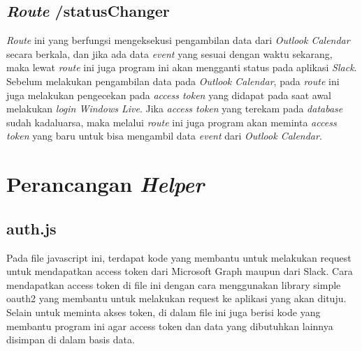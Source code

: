 \subsection{\textit{Route} /statusChanger}
\textit{Route} ini yang berfungsi mengeksekusi pengambilan data dari \textit{Outlook Calendar} secara berkala, dan jika ada data \textit{event} yang sesuai dengan waktu sekarang, maka lewat \textit{route} ini juga program ini akan mengganti status pada aplikasi \textit{Slack}. Sebelum melakukan pengambilan data pada \textit{Outlook Calendar}, pada \textit{route} ini juga melakukan pengecekan pada \textit{access token} yang didapat pada saat awal melakukan \textit{login Windows Live}. Jika \textit{access token} yang terekam pada \textit{database} sudah kadaluarsa, maka melalui \textit{route} ini juga program akan meminta \textit{access token} yang baru untuk bisa mengambil data \textit{event} dari \textit{Outlook Calendar}. 

\section{Perancangan \textit{Helper}}
\subsection{auth.js}
Pada file javascript ini, terdapat kode yang membantu untuk melakukan request untuk mendapatkan access token dari Microsoft Graph maupun dari Slack. Cara mendapatkan access token di file ini dengan cara menggunakan library simple oauth2 yang membantu untuk melakukan request ke aplikasi yang akan dituju. Selain untuk meminta akses token, di dalam file ini juga berisi kode yang membantu program ini agar access token dan data yang dibutuhkan lainnya disimpan di dalam basis data.

